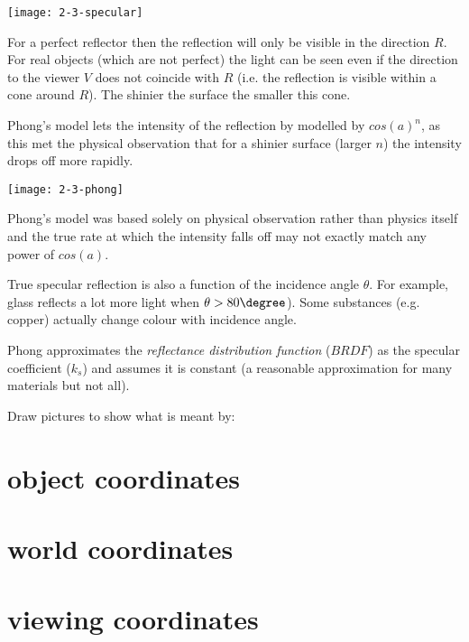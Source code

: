 \documentclass{supervision}
\begin{document}
\begin{questions}
\begin{solution}
    \begin{center}
        \texttt{[image: 2-3-specular]}
    \end{center}
    
    For a perfect reflector then the reflection will only be visible in the direction $R$. For real objects (which are not perfect) the light can be seen even if the direction to the viewer $V$ does not coincide with $R$ (i.e. the reflection is visible within a cone around $R$). The shinier the surface the smaller this cone.
    
    Phong's model lets the intensity of the reflection by modelled by $cos(a)^n$, as this met the physical observation that for a shinier surface (larger $n$) the intensity drops off more rapidly.
    
    \begin{center}
        \texttt{[image: 2-3-phong]}
    \end{center}
    
    Phong's model was based solely on physical observation rather than physics itself and the true rate at which the intensity falls off may not exactly match any power of $cos(a)$.
    
    True specular reflection is also a function of the incidence angle $\theta$. For example, glass reflects a lot more light when $\theta > 80\degree$). Some substances (e.g. copper) actually change colour with incidence angle.
    
    Phong approximates the \textit{reflectance distribution function} ($BRDF$) as the specular coefficient ($k_s$) and assumes it is constant (a reasonable approximation for many materials but not all).
    
    \end{solution}

    \question
    Draw pictures to show what is meant by:
    \begin{parts}
        \part{object coordinates}
        \part{world coordinates}
        \part{viewing coordinates}

\end{parts}
\end{questions}
\end{document}
